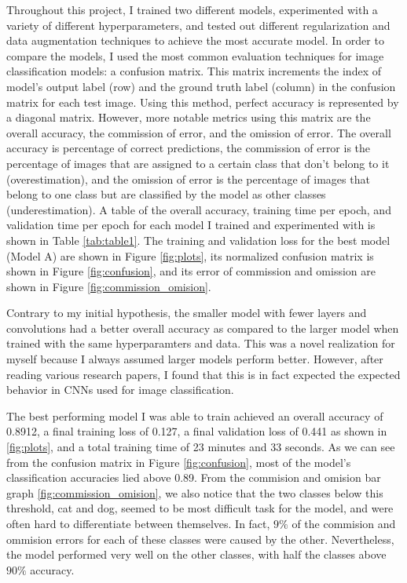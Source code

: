 \documentclass[11pt,a4paper]{article}
\begin{document}
Throughout this project, I trained two different models, experimented with a variety of different hyperparameters,
 and tested out different regularization and data augmentation techniques to achieve the most accurate model. In order 
 to compare the models, I used the most common evaluation techniques for image classification models: a confusion matrix. 
 This matrix increments the index of model's output label (row) and the ground truth label (column) in the confusion matrix for each test image. Using this
 method, perfect accuracy is represented by a diagonal matrix. However, more notable metrics using this matrix are the 
 overall accuracy, the commission of error, and the omission of error. The overall accuracy is percentage of correct 
 predictions, the commission of error is the percentage of images that are assigned to a certain class that don't belong 
 to it (overestimation), and the omission of error is the percentage of images that belong to one class but are classified by the model 
 as other classes (underestimation). A table of the overall accuracy, training time per epoch, and validation time per epoch 
 for each model I trained and experimented with is shown in Table \ref{tab:table1}. The training and validation loss for the best model (Model A)
 are shown in Figure \ref{fig:plots}, its normalized confusion matrix is shown in Figure \ref{fig:confusion}, and its error of commission
  and omission are shown in Figure \ref{fig:commission_omision}.

Contrary to my initial hypothesis, the smaller model with fewer layers and convolutions had a better overall accuracy as compared to the larger model 
 when trained with the same hyperparamters and data. This was a novel realization for myself because I always assumed larger models perform better. However, after reading 
 various research papers, I found that this is in fact expected the expected behavior in CNNs used for image classification. 

The best performing model I was able to train achieved an overall accuracy of 0.8912, a final training loss of 0.127, a final validation loss of 0.441 as shown in \ref{fig:plots}, and a total training time of 23 minutes and 33 seconds.
  As we can see from the confusion matrix in Figure \ref{fig:confusion}, most of the model's classification accuracies lied above 0.89. From the commision and omision bar graph
   \ref{fig:commission_omision}, we also notice that the two classes below this threshold, cat and dog, seemed to be most difficult task for the model, and were often hard to differentiate between themselves.
   In fact, $9\%$ of the commision and ommision errors for each of these classes were caused by the other. Nevertheless, the model performed very well on the other classes, with half the classes
   above $90\%$ accuracy.
\end{document}
